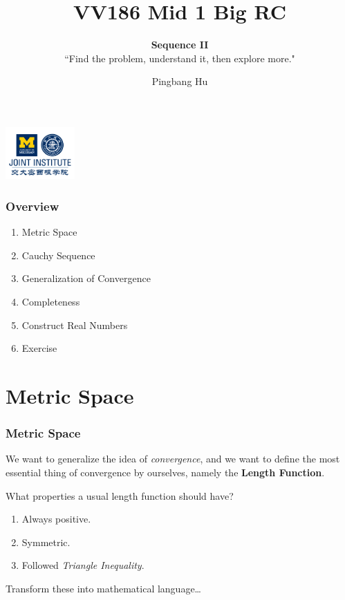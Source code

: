 \documentclass[12pt, t]{beamer}
\title{VV186 Mid 1 Big RC}
\subtitle{\textbf{Sequence II}\\``Find the problem, understand it, then explore more."}
\institute[UM-SJTU JI]{University of Michigan-Shanghai Jiao Tong University Joint Institute}
\author{Pingbang Hu}
\renewcommand{\emph}[1]{{\color{Turquoise3}\textsl{#1}}}
\begin{document}
\begin{frame}
    \titlepage
    \begin{center}
        \includegraphics[height=2cm]{Figures/logo/logo2.png}
    \end{center}
\end{frame}

\begin{frame}
    \frametitle{Overview}
    \begin{enumerate}
        \item Metric Space
        \item Cauchy Sequence
        \item Generalization of Convergence
        \item Completeness
        \item Construct Real Numbers
        \item Exercise
    \end{enumerate}
\end{frame}


\section{Metric Space}
\begin{frame}
    \frametitle{Metric Space}
    We want to generalize the idea of \emph{convergence}, and we want to define the most essential thing of convergence by ourselves,
    namely the \textbf{Length Function}.\\

    \vspace{1em}

    What properties a usual length function should have?
    \begin{enumerate}
        \item Always positive.
        \item Symmetric.
        \item Followed \emph{Triangle Inequality}.
    \end{enumerate}

    \vspace{1em}

    Transform these into mathematical language\dots
\end{frame}
\end{document}
